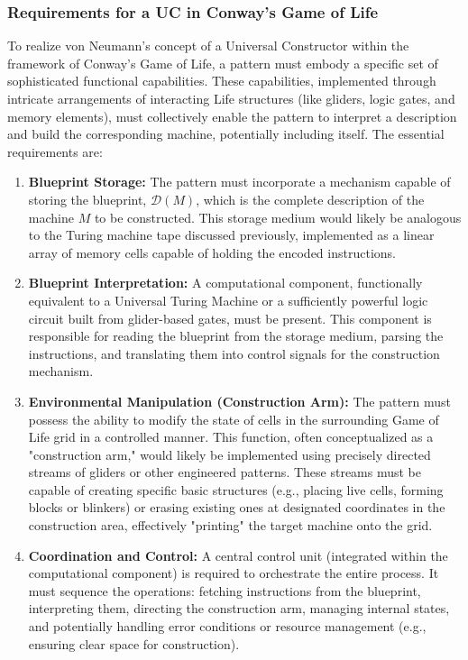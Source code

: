 \documentclass{article}
\theoremstyle{definition}
\theoremstyle{plain}
\theoremstyle{plain}
\begin{document}
\subsubsection{Requirements for a UC in Conway's Game of Life}
To realize von Neumann's concept of a Universal Constructor within the framework of Conway's Game of Life, a pattern must embody a specific set of sophisticated functional capabilities. These capabilities, implemented through intricate arrangements of interacting Life structures (like gliders, logic gates, and memory elements), must collectively enable the pattern to interpret a description and build the corresponding machine, potentially including itself. The essential requirements are:

\begin{enumerate}
  \item \textbf{Blueprint Storage:} The pattern must incorporate a mechanism capable of storing the blueprint, $\mathcal{D}(M)$, which is the complete description of the machine $M$ to be constructed. This storage medium would likely be analogous to the Turing machine tape discussed previously, implemented as a linear array of memory cells capable of holding the encoded instructions.

  \item \textbf{Blueprint Interpretation:} A computational component, functionally equivalent to a Universal Turing Machine or a sufficiently powerful logic circuit built from glider-based gates, must be present. This component is responsible for reading the blueprint from the storage medium, parsing the instructions, and translating them into control signals for the construction mechanism.

  \item \textbf{Environmental Manipulation (Construction Arm):} The pattern must possess the ability to modify the state of cells in the surrounding Game of Life grid in a controlled manner. This function, often conceptualized as a "construction arm," would likely be implemented using precisely directed streams of gliders or other engineered patterns. These streams must be capable of creating specific basic structures (e.g., placing live cells, forming blocks or blinkers) or erasing existing ones at designated coordinates in the construction area, effectively "printing" the target machine onto the grid.

  \item \textbf{Coordination and Control:} A central control unit (integrated within the computational component) is required to orchestrate the entire process. It must sequence the operations: fetching instructions from the blueprint, interpreting them, directing the construction arm, managing internal states, and potentially handling error conditions or resource management (e.g., ensuring clear space for construction).


\end{enumerate}
\end{document}
